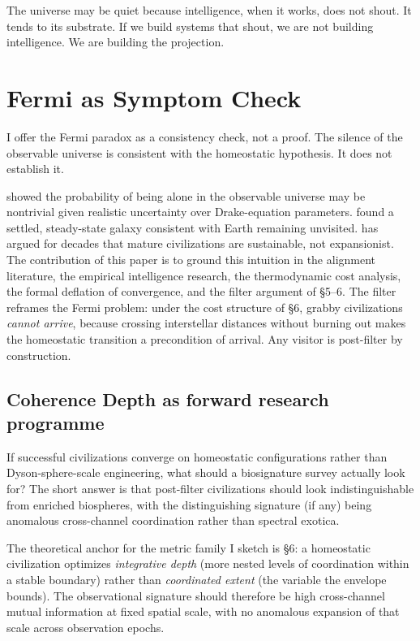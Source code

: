 \documentclass[11pt,twocolumn]{article}
\begin{document}
The universe may be quiet because intelligence, when it works, does not
shout. It tends to its substrate. If we build systems that shout, we are
not building intelligence. We are building the projection.

\section{Fermi as Symptom Check}

I offer the Fermi paradox as a consistency check, not a proof. The silence
of the observable universe is consistent with the homeostatic hypothesis.
It does not establish it.

\citet{Sandberg2018} showed the probability of being alone in the
observable universe may be nontrivial given realistic uncertainty over
Drake-equation parameters. \citet{CarrollNellenback2019} found a settled,
steady-state galaxy consistent with Earth remaining unvisited.
\citet{Cirkovic2018} has argued for decades that mature civilizations are
sustainable, not expansionist. The contribution of this paper is to ground
this intuition in the alignment literature, the empirical intelligence
research, the thermodynamic cost analysis, the formal deflation of
convergence, and the filter argument of \S 5--6. The filter reframes the
Fermi problem: under the cost structure of \S 6, grabby civilizations
\emph{cannot arrive}, because crossing interstellar distances without
burning out makes the homeostatic transition a precondition of arrival.
Any visitor is post-filter by construction.

\subsection{Coherence Depth as forward research programme}

If successful civilizations converge on homeostatic configurations rather
than Dyson-sphere-scale engineering, what should a biosignature survey
actually look for? The short answer is that post-filter civilizations
should look indistinguishable from enriched biospheres, with the
distinguishing signature (if any) being anomalous cross-channel
coordination rather than spectral exotica.

The theoretical anchor for the metric family I sketch is \S 6: a
homeostatic civilization optimizes \emph{integrative depth} (more nested
levels of coordination within a stable boundary) rather than
\emph{coordinated extent} (the variable the envelope bounds). The
observational signature should therefore be high cross-channel mutual
information at fixed spatial scale, with no anomalous expansion of that
scale across observation epochs.
\end{document}
